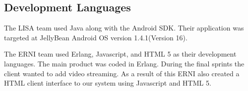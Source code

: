 \subsection{Development Languages}

The LISA team used Java along with the Android SDK. Their application was targeted at JellyBean Android OS version 1.4.1(Version 16).

The ERNI team used Erlang, Javascript, and HTML 5  as their development languages. The main product was coded in Erlang. During the final sprints the client wanted to add video streaming. As a result of this ERNI also created a HTML client interface to our system using Javascript and HTML 5. 
